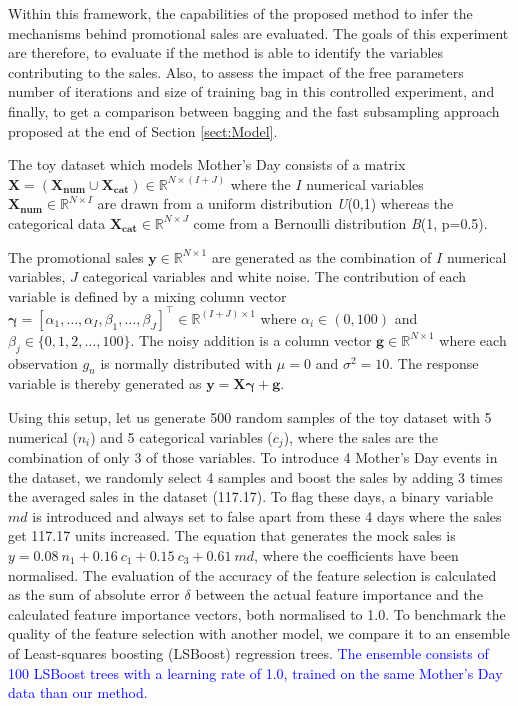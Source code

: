 \documentclass{ieeeaccess}
\newcommand{\myblue}[1]{\textcolor{blue}{#1}}
\begin{document}
Within this framework, the capabilities of the proposed method to infer the mechanisms behind promotional sales are evaluated. The goals of this experiment are therefore, to evaluate if the method is       able to identify the variables contributing to the sales. Also, to assess the impact of the free parameters number of iterations and size of training bag in this controlled experiment, and finally, to get a comparison between bagging and the fast subsampling approach proposed at the end of Section \ref{sect:Model}.

The toy dataset which models Mother's Day consists of a matrix $\mathbf{X} = ( \mathbf{X_{num}} \cup \mathbf{X_{cat}} ) \in \mathbb{R}^{N \times (I+J)}$ where the $I$ numerical variables $\mathbf{X_{num}} \in \mathbb{R}^{N \times I}$ are drawn from a uniform distribution \textit{U}(0,1) whereas the categorical data $\mathbf{X_{cat}} \in \mathbb{R}^{N \times J}$ come from a Bernoulli distribution \textit{B}(1, p=0.5). 

The promotional sales $\mathbf{y} \in \mathbb{R}^{N \times 1}$ are generated as the combination of $I$ numerical variables, $J$ categorical variables and white noise. The contribution of each variable is defined by a mixing column vector $\boldsymbol{\gamma}=[\alpha_1,\ldots,\alpha_I,\beta_1,\ldots,\beta_J]^\top \in \mathbb{R}^{(I+J) \times 1}$ where $\alpha_i \in (0, 100)$ and  $\beta_j \in \{0, 1, 2, \ldots, 100\}$. The noisy addition is a column vector $\mathbf{g} \in \mathbb{R}^{N \times 1}$ where each observation $g_n$ is normally distributed with $\mu = 0$ and $\sigma^{2} = 10$. The response variable is thereby  generated as $\mathbf{y} = \mathbf{X}\boldsymbol{\gamma} + \mathbf{g}$.

Using this setup, let us generate 500 random samples of the toy dataset with 5 numerical ($n_i$) and 5 categorical variables ($c_j$), where the sales are the combination of only 3 of those variables. To introduce 4 Mother's Day events in the dataset, we randomly select 4 samples and boost the sales by adding 3 times the averaged sales in the dataset (117.17). To flag these days, a binary variable $md$ is introduced and always set to false apart from these 4 days where the sales get 117.17 units increased. The equation that generates the mock sales is $y = 0.08 ~ n_1 + 0.16 ~ c_1 + 0.15 ~ c_3 + 0.61 ~ md$, where the coefficients have been normalised. %
The evaluation of the accuracy of the feature selection is calculated as the sum of absolute error $\delta$ between the actual feature importance and the calculated feature importance vectors, both normalised to 1.0. To benchmark the quality of the feature selection with another model, we compare it to an ensemble of Least-squares boosting (LSBoost) regression trees. \myblue{The ensemble consists of 100 LSBoost trees with a learning rate of 1.0, trained on the same Mother's Day data than our method.}
\end{document}
